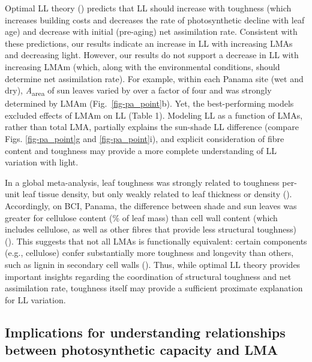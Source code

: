 \documentclass[
  12pt,
  letterpaper,
  DIV=11,
  numbers=noendperiod]{scrartcl}
\begin{document}
Optimal LL theory () predicts
that LL should increase with toughness (which increases building costs
and decreases the rate of photosynthetic decline with leaf age) and
decrease with initial (pre-aging) net assimilation rate. Consistent with
these predictions, our results indicate an increase in LL with
increasing LMAs and decreasing light. However, our results do not
support a decrease in LL with increasing LMAm (which, along with the
environmental conditions, should determine net assimilation rate). For
example, within each Panama site (wet and dry),
\emph{A}\textsubscript{area} of sun leaves varied by over a factor of
four and was strongly determined by LMAm (Fig.~\ref{fig-pa_point}b).
Yet, the best-performing models excluded effects of LMAm on LL (Table
1). Modeling LL as a function of LMAs, rather than total LMA, partially
explains the sun-shade LL difference (compare Figs. \ref{fig-pa_point}g
and \ref{fig-pa_point}i), and explicit consideration of fibre content
and toughness may provide a more complete understanding of LL variation
with light.

In a global meta-analysis, leaf toughness was strongly related to
toughness per-unit leaf tissue density, but only weakly related to leaf
thickness or density ().
Accordingly, on BCI, Panama, the difference between shade and sun leaves
was greater for cellulose content (\% of leaf mass) than cell wall
content (which includes cellulose, as well as other fibres that provide
less structural toughness) (). This suggests that not all LMAs is functionally equivalent:
certain components (e.g., cellulose) confer substantially more toughness
and longevity than others, such as lignin in secondary cell walls
(). Thus, while optimal
LL theory provides important insights regarding the coordination of
structural toughness and net assimilation rate, toughness itself may
provide a sufficient proximate explanation for LL variation.

\subsection{Implications for understanding relationships between
photosynthetic capacity and
LMA}\label{implications-for-understanding-relationships-between-photosynthetic-capacity-and-lma}
\end{document}
